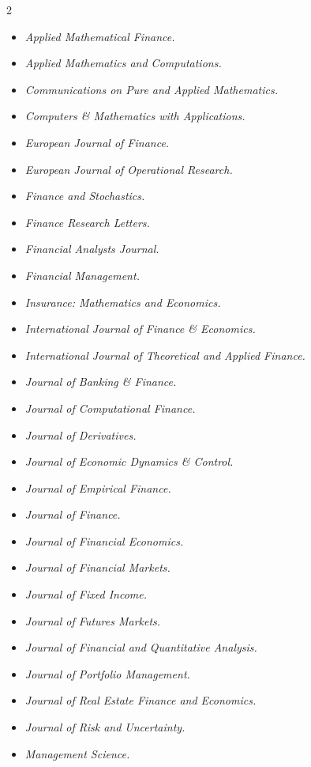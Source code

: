 \begin{multicols}{2}
	\begin{itemize}[nosep, font=\normalfont, label=\textcolor{Gray}{\textbullet}]
		\item \emph{Applied Mathematical Finance.}
		\item \emph{Applied Mathematics and Computations.}
		\item \emph{Communications on Pure and Applied Mathematics.}
		\item \emph{Computers \& Mathematics with Applications.}
		\item \emph{European Journal of Finance.}
		\item \emph{European Journal of Operational Research.}
		\item \emph{Finance and Stochastics.}
		\item \emph{Finance Research Letters.}
		\item \emph{Financial Analysts Journal.}
		\item \emph{Financial Management.}
		\item \emph{Insurance: Mathematics and Economics.}
		\item \emph{International Journal of Finance \& Economics.}
		\item \emph{International Journal of Theoretical and Applied Finance.}
		\item \emph{Journal of Banking \& Finance.}
		\item \emph{Journal of Computational Finance.}
		\item \emph{Journal of Derivatives.}
		\item \emph{Journal of Economic Dynamics \& Control.}
		\item \emph{Journal of Empirical Finance.}
		\item \emph{Journal of Finance.}
		\item \emph{Journal of Financial Economics.}
		\item \emph{Journal of Financial Markets.}
		\item \emph{Journal of Fixed Income.}
		\item \emph{Journal of Futures Markets.}
		\item \emph{Journal of Financial and Quantitative Analysis.}
		\item \emph{Journal of Portfolio Management.}
		\item \emph{Journal of Real Estate Finance and Economics.}
		\item \emph{Journal of Risk and Uncertainty.}
		\item \emph{Management Science.}

\end{itemize}
\end{multicols}
